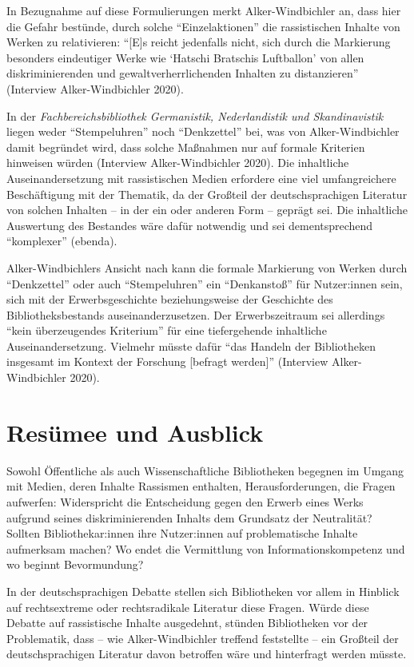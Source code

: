 \documentclass[a4paper,
fontsize=11pt,
oneside,
numbers=noperiodatend,
parskip=half-,
bibliography=totoc,
final
]{scrartcl}
\begin{document}
In Bezugnahme auf diese Formulierungen merkt Alker-Windbichler an, dass
hier die Gefahr bestünde, durch solche \enquote{Einzelaktionen} die
rassistischen Inhalte von Werken zu relativieren: \enquote{[E]s reicht
jedenfalls nicht, sich durch die Markierung besonders eindeutiger Werke
wie `Hatschi Bratschis Luftballon' von allen diskriminierenden und
gewaltverherrlichenden Inhalten zu distanzieren} (Interview
Alker-Windbichler 2020).

In der \emph{Fachbereichsbibliothek Germanistik, Nederlandistik und
Skandinavistik} liegen weder \enquote{Stempeluhren} noch \enquote{Denkzettel} bei,
was von Alker-Windbichler damit begründet wird, dass solche Maßnahmen
nur auf formale Kriterien hinweisen würden (Interview Alker-Windbichler
2020). Die inhaltliche Auseinandersetzung mit rassistischen Medien
erfordere eine viel umfangreichere Beschäftigung mit der Thematik, da
der Großteil der deutschsprachigen Literatur von solchen Inhalten -- in
der ein oder anderen Form -- geprägt sei. Die inhaltliche Auswertung des
Bestandes wäre dafür notwendig und sei dementsprechend \enquote{komplexer}
(ebenda).

Alker-Windbichlers Ansicht nach kann die formale Markierung von Werken
durch \enquote{Denkzettel} oder auch \enquote{Stempeluhren} ein \enquote{Denkanstoß} für
Nutzer:innen sein, sich mit der Erwerbsgeschichte beziehungsweise der
Geschichte des Bibliotheksbestands auseinanderzusetzen. Der
Erwerbszeitraum sei allerdings \enquote{kein überzeugendes Kriterium} für eine
tiefergehende inhaltliche Auseinandersetzung. Vielmehr müsste dafür
\enquote{das Handeln der Bibliotheken insgesamt im Kontext der Forschung
[befragt werden]} (Interview Alker-Windbichler 2020).

\hypertarget{resuxfcmee-und-ausblick}{%
\section{Resümee und Ausblick}\label{resuxfcmee-und-ausblick}}

Sowohl Öffentliche als auch Wissenschaftliche Bibliotheken begegnen im
Umgang mit Medien, deren Inhalte Rassismen enthalten, Herausforderungen,
die Fragen aufwerfen: Widerspricht die Entscheidung gegen den Erwerb
eines Werks aufgrund seines diskriminierenden Inhalts dem Grundsatz der
Neutralität? Sollten Bibliothekar:innen ihre Nutzer:innen auf
problematische Inhalte aufmerksam machen? Wo endet die Vermittlung von
Informationskompetenz und wo beginnt Bevormundung?

In der deutschsprachigen Debatte stellen sich Bibliotheken vor allem in
Hinblick auf rechtsextreme oder rechtsradikale Literatur diese Fragen.
Würde diese Debatte auf rassistische Inhalte ausgedehnt, stünden
Bibliotheken vor der Problematik, dass -- wie Alker-Windbichler treffend
feststellte -- ein Großteil der deutschsprachigen Literatur davon
betroffen wäre und hinterfragt werden müsste.
\end{document}
